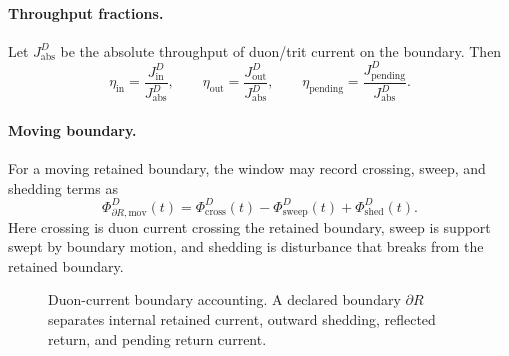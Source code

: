 \paragraph{Throughput fractions.}
Let \(J^D_{\mathrm{abs}}\) be the absolute throughput of duon/trit current on the boundary. Then
\[
\eta_{\mathrm{in}}
=
\frac{J^D_{\mathrm{in}}}{J^D_{\mathrm{abs}}},
\qquad
\eta_{\mathrm{out}}
=
\frac{J^D_{\mathrm{out}}}{J^D_{\mathrm{abs}}},
\qquad
\eta_{\mathrm{pending}}
=
\frac{J^D_{\mathrm{pending}}}{J^D_{\mathrm{abs}}}.
\]

\paragraph{Moving boundary.}
For a moving retained boundary, the window may record crossing, sweep, and shedding terms as
\[
\Phi^D_{\partial R,\mathrm{mov}}(t)
=
\Phi^D_{\mathrm{cross}}(t)
-
\Phi^D_{\mathrm{sweep}}(t)
+
\Phi^D_{\mathrm{shed}}(t).
\]
Here crossing is duon current crossing the retained boundary, sweep is support swept by boundary motion, and shedding is disturbance that breaks from the retained boundary.

\begin{figure}[H]
\centering
{}
\caption{Duon-current boundary accounting. A declared boundary \(\partial R\) separates internal retained current, outward shedding, reflected return, and pending return current.}
\label{fig:v39-duon-current-boundary-accounting}
\end{figure}

